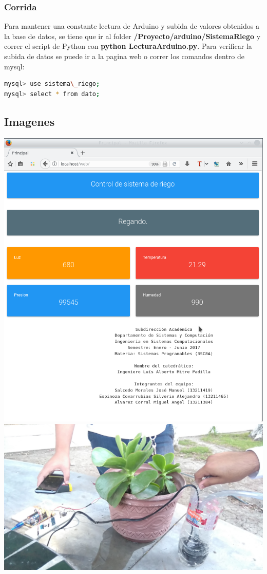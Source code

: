 \documentclass{article}
\begin{document}
\subsubsection{Corrida}
Para mantener una constante lectura de Arduino y subida de valores obtenidos a la base de datos, se tiene que ir al folder \textbf{/Proyecto/arduino/SistemaRiego} y correr el script de Python con \textbf{python LecturaArduino.py}.
\newline Para verificar la subida de datos se puede ir a la pagina web o correr los comandos dentro de mysql:
\begin{lstlisting}[language=bash]
mysql> use sistema\_riego;
mysql> select * from dato;
\end{lstlisting}

\subsection{Imagenes}
\includegraphics[width=\textwidth]{captura/InterfazWeb}
\includegraphics[width=\textwidth]{captura/1}
\end{document}
